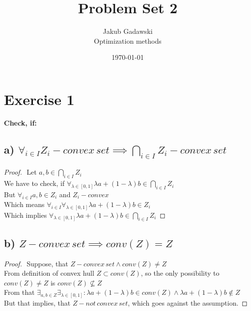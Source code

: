\documentclass[12pt]{article}
\title{Problem Set 2} %
\author{Jakub Gadawski\\ %
Optimization methods
}
\date{\today} %
\begin{document}
\setlength{\droptitle}{-5em}
\maketitle


\section*{Exercise 1}
{\bfseries Check, if:}

\subsection*{a) \( \forall_{i \in I} Z_i - convex \, set \implies \bigcap_{i \in I} Z_i - convex\,set\)}
\begin{proof}
    $ $\newline
    Let \(a,b \in \bigcap_{i \in I} Z_i\)\\
    We have to check, if \(\forall_{\lambda \in [0,1]} \lambda a + (1-\lambda)b \in \bigcap_{i \in I} Z_i\)\\
    But \( \forall_{i \in I} a, b \in Z_i\) and \(Z_i - convex\)\\
    Which means \(\forall_{i \in I} \forall_{\lambda \in [0,1]} \lambda a + (1-\lambda)b \in Z_i\)\\
    Which implies \(\forall_{\lambda \in [0,1]} \lambda a + (1-\lambda)b \in \bigcap_{i \in I} Z_i\)
\end{proof}


\subsection*{b) \( Z - convex\,set \implies conv(Z) = Z \)}
\begin{proof}
    $ $\newline
    Suppose, that \( Z - convex\,set \land conv(Z) \neq Z \)\\
    From definition of convex hull \(Z \subset conv(Z)\), so the only possibility to \(conv(Z) \neq Z\) is \(conv(Z) \nsubseteq Z\)\\
    From that \(\exists_{a,b \in Z}\exists_{\lambda\in [0,1]}: \lambda a + (1-\lambda)b \in conv(Z) \land \lambda a + (1-\lambda)b \notin Z \)\\
    But that implies, that \(Z - not\,convex\,set\), which goes against the assumption.
\end{proof}
\end{document}
